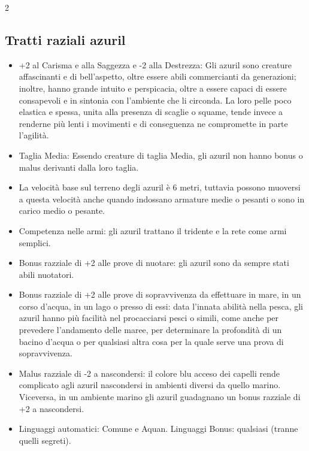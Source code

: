 \documentclass[10pt, a4paper]{report}
\begin{document}
\begin{multicols}{2}
\subsection*{Tratti raziali azuril}
\begin{itemize}
	\item +2 al Carisma e alla Saggezza e -2 alla Destrezza: Gli azuril sono creature affascinanti e di bell’aspetto, oltre essere abili commercianti da generazioni; inoltre, hanno grande intuito e perspicacia, oltre a essere capaci di essere consapevoli e in sintonia con l’ambiente che li circonda. La loro pelle poco elastica e spessa, unita alla presenza di scaglie o squame, tende invece a renderne più lenti i movimenti e di conseguenza ne compromette in parte l’agilità.
	\item Taglia Media: Essendo creature di taglia Media, gli azuril non hanno bonus o malus derivanti dalla loro taglia.
	\item La velocità base sul terreno degli azuril è 6 metri, tuttavia possono muoversi a questa velocità anche quando indossano armature medie o pesanti o sono in carico medio o pesante.
	\item Competenza nelle armi: gli azuril trattano il tridente e la rete come armi semplici.
	\item Bonus razziale di +2 alle prove di nuotare: gli azuril sono da sempre stati abili nuotatori.
	\item Bonus razziale di +2 alle prove di sopravvivenza da effettuare in mare, in un corso d’acqua, in un lago o presso di essi: data l’innata abilità nella pesca, gli azuril hanno più facilità nel procacciarsi pesci o simili, come anche per prevedere l’andamento delle maree, per determinare la profondità di un bacino d’acqua o per qualsiasi altra cosa per la quale serve una prova di sopravvivenza.
	\item Malus razziale di -2 a nascondersi: il colore blu acceso dei capelli rende complicato agli azuril nascondersi in ambienti diversi da quello marino. Viceversa, in un ambiente marino gli azuril guadagnano un bonus razziale di +2 a nascondersi.             
	\item Linguaggi automatici: Comune e Aquan. Linguaggi Bonus: qualsiasi (tranne quelli segreti).

\end{itemize}

\end{multicols}
\end{document}
